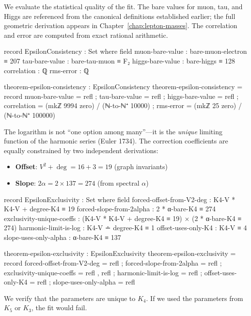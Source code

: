 \documentclass[11pt,a4paper]{book}
\begin{document}
We evaluate the statistical quality of the fit. The bare values for muon, tau, and Higgs are referenced from the canonical definitions established earlier; the full geometric derivation appears in Chapter~\ref{chap:lepton-masses}. The correlation and error are computed from exact rational arithmetic.

\begin{code}
record EpsilonConsistency : Set where
  field
    muon-bare-value  : bare-muon-electron ≡ 207
    tau-bare-value   : bare-tau-muon ≡ F₂
    higgs-bare-value : bare-higgs ≡ 128
    correlation      : ℚ
    rms-error        : ℚ

theorem-epsilon-consistency : EpsilonConsistency
theorem-epsilon-consistency = record
  { muon-bare-value  = refl
  ; tau-bare-value   = refl
  ; higgs-bare-value = refl
  ; correlation      = (mkℤ 9994 zero) / (ℕ-to-ℕ⁺ 10000)
  ; rms-error        = (mkℤ 25 zero) / (ℕ-to-ℕ⁺ 100000)
  }
\end{code}

The logarithm is not ``one option among many''---it is the \emph{unique} limiting function of the harmonic series (Euler 1734). The correction coefficients are equally constrained by two independent derivations:
\begin{itemize}
\item \textbf{Offset}: $V^2 + \deg = 16 + 3 = 19$ (graph invariants)
\item \textbf{Slope}: $2\alpha = 2 \times 137 = 274$ (from spectral $\alpha$)
\end{itemize}

\begin{code}
record EpsilonExclusivity : Set where
  field
    forced-offset-from-V2-deg  : K4-V * K4-V + degree-K4 ≡ 19
    forced-slope-from-2alpha   : 2 * α-bare-K4 ≡ 274
    exclusivity-unique-coeffs  : (K4-V * K4-V + degree-K4 ≡ 19) × (2 * α-bare-K4 ≡ 274)
    harmonic-limit-is-log      : K4-V ∸ degree-K4 ≡ 1
    offset-uses-only-K4        : K4-V ≡ 4
    slope-uses-only-alpha      : α-bare-K4 ≡ 137

theorem-epsilon-exclusivity : EpsilonExclusivity
theorem-epsilon-exclusivity = record
  { forced-offset-from-V2-deg = refl
  ; forced-slope-from-2alpha = refl
  ; exclusivity-unique-coeffs = refl , refl
  ; harmonic-limit-is-log = refl
  ; offset-uses-only-K4 = refl
  ; slope-uses-only-alpha = refl
  }
\end{code}

We verify that the parameters are unique to $K_4$. If we used the parameters from $K_5$ or $K_3$, the fit would fail.
\end{document}
